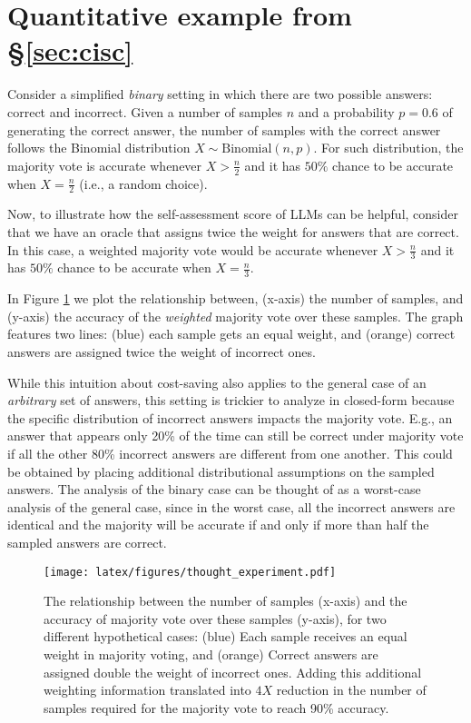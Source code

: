\section{Quantitative example from \S\ref{sec:cisc}}
\label{appendix:example}

Consider a simplified \emph{binary} setting in which there are two possible answers: correct and incorrect.  Given a number of samples $n$ and a probability $p=0.6$ of generating the correct answer, the number of samples with the correct answer follows the Binomial distribution  $X \sim \text{Binomial}(n, p)$. For such distribution, the majority vote is accurate whenever $X > \frac{n}{2}$ and it has $50\%$ chance to be accurate when $X = \frac{n}{2}$ (i.e., a random choice). 

Now, to illustrate how the self-assessment score of LLMs can be helpful, consider that we have an oracle that assigns twice the weight for answers that are correct. In this case, a weighted majority vote would be accurate whenever $X > \frac{n}{3}$ and it has $50\%$ chance to be accurate when $X = \frac{n}{3}$. 

In Figure \ref{fig:thought_experiment} we plot the relationship between, (x-axis) the number of samples, and (y-axis) the accuracy of the \emph{weighted} majority vote over these samples. The graph features two lines: (blue) each sample gets an equal weight, and (orange) correct answers are assigned twice the weight of incorrect ones.

While this intuition about cost-saving also applies to the general case of an \emph{arbitrary} set of answers, this setting is trickier to analyze in closed-form  because the specific distribution of incorrect answers impacts the majority vote. E.g., an answer that appears only 20\% of the time can still be correct under majority vote if all the other 80\% incorrect answers are different from one another. This could be obtained by placing additional distributional assumptions on the sampled answers. The analysis of the binary case can be thought of as a worst-case analysis of the general case, since in the worst case, all the incorrect answers are identical and the majority will be accurate if and only if more than half the sampled answers are correct.

\begin{figure}[h]
\setlength{\belowcaptionskip}{-10pt}
    \centering
    \texttt{[image: latex/figures/thought\_experiment.pdf]}
    \caption{The relationship between the number of samples (x-axis) and the accuracy of majority vote over these samples (y-axis), for two different hypothetical cases: 
     (blue) Each sample receives an equal weight in majority voting, and (orange) Correct answers are assigned double the weight of incorrect ones. Adding this additional weighting information translated into $4X$ reduction in the number of samples required for the majority vote to reach 90\% accuracy.
    }
    \label{fig:thought_experiment}
\end{figure}